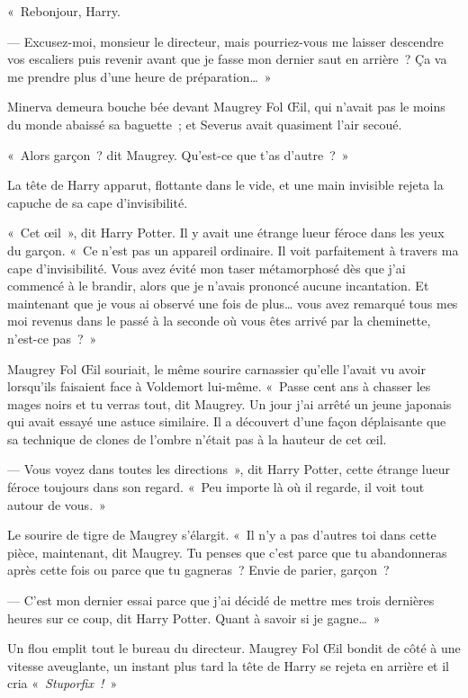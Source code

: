 \later

«~Rebonjour, Harry.

--- Excusez-moi, monsieur le directeur, mais pourriez-vous me laisser descendre vos escaliers puis revenir avant que je fasse mon dernier saut en arrière~?
Ça va me prendre plus d'une heure de préparation…~»

\later

Minerva demeura bouche bée devant Maugrey Fol Œil, qui n'avait pas le moins du monde abaissé sa baguette~; et Severus avait quasiment l'air secoué.

«~Alors garçon~? dit Maugrey.
Qu'est-ce que t'as d'autre~?~»

La tête de Harry apparut, flottante dans le vide, et une main invisible rejeta la capuche de sa cape d'invisibilité.

«~Cet œil~», dit Harry Potter.
Il y avait une étrange lueur féroce dans les yeux du garçon.
«~Ce n'est pas un appareil ordinaire.
Il voit parfaitement à travers ma cape d'invisibilité.
Vous avez évité mon taser métamorphosé dès que j'ai commencé à le brandir, alors que je n'avais prononcé aucune incantation.
Et maintenant que je vous ai observé une fois de plus… vous avez remarqué tous mes moi revenus dans le passé à la seconde où vous êtes arrivé par la cheminette, n'est-ce pas~?~»

Maugrey Fol Œil souriait, le même sourire carnassier qu'elle l'avait vu avoir lorsqu'ils faisaient face à Voldemort lui-même.
«~Passe cent ans à chasser les mages noirs et tu verras tout, dit Maugrey.
Un jour j'ai arrêté un jeune japonais qui avait essayé une astuce similaire.
Il a découvert d'une façon déplaisante que sa technique de clones de l'ombre n'était pas à la hauteur de cet œil.

--- Vous voyez dans toutes les directions~», dit Harry Potter, cette étrange lueur féroce toujours dans son regard.
«~Peu importe là où il regarde, il voit tout autour de vous.~»

Le sourire de tigre de Maugrey s'élargit.
«~Il n'y a pas d'autres toi dans cette pièce, maintenant, dit Maugrey.
Tu penses que c'est parce que tu abandonneras après cette fois ou parce que tu gagneras~?
Envie de parier, garçon~?

--- C'est mon dernier essai parce que j'ai décidé de mettre mes trois dernières heures sur ce coup, dit Harry Potter.
Quant à savoir si je gagne…~»

Un flou emplit tout le bureau du directeur.
Maugrey Fol Œil bondit de côté à une vitesse aveuglante, un instant plus tard la tête de Harry se rejeta en arrière et il cria «~\emph{Stuporfix~!}~»

